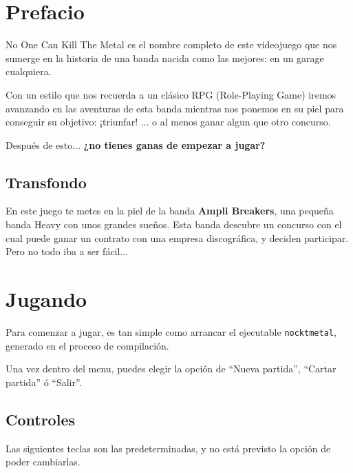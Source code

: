 \section{Prefacio}

No One Can Kill The Metal es el nombre completo de este videojuego que nos 
sumerge en la historia de una banda nacida como las mejores: en un garage 
cualquiera.

Con un estilo que nos recuerda a un clásico RPG (Role-Playing Game) iremos 
avanzando en las aventuras de esta banda mientras nos ponemos en su piel 
para conseguir su objetivo: ¡triunfar! ... o al menos ganar algun que otro 
concurso.

Después de esto... \textbf{¿no tienes ganas de empezar a jugar?}

\subsection{Transfondo}

En este juego te metes en la piel de la banda \textbf{Ampli Breakers}, una
pequeña banda Heavy con unos grandes sueños. Esta banda descubre un concurso
con el cual puede ganar un contrato con una empresa discográfica, y deciden
participar. \\

Pero no todo iba a ser fácil...

\section{Jugando}

Para comenzar a jugar, es tan simple como arrancar el ejecutable 
\texttt{nocktmetal}, generado en el proceso de compilación.

Una vez dentro del menu, puedes elegir la opción de ``Nueva partida'', 
``Cartar partida'' ó ``Salir''.

\subsection{Controles}

Las siguientes teclas son las predeterminadas, y no está previsto la opción
de poder cambiarlas.

